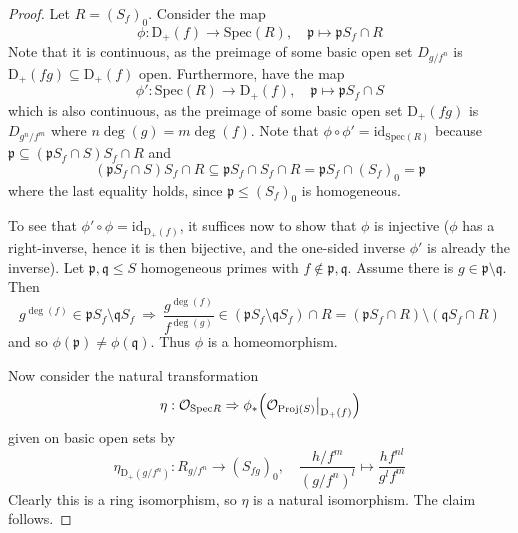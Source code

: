 \documentclass{scrartcl}
\newcommand{\D}[1]{\mathrm{D}_+(#1)}
\newcommand{\p}{\mathfrak{p}}
\newcommand{\q}{\mathfrak{q}}
\newcommand{\Spec}{\mathrm{Spec}}
\newcommand{\Proj}{\mathrm{Proj}}
\renewcommand{\O}{\mathcal{O}}
\newcommand\restr[2]{{
    \left.\kern-\nulldelimiterspace
    #1
    \vphantom{\big|}
    \right|_{#2}
}}
\theoremstyle{definition}
\begin{document}
\begin{proof}
    Let $R = (S_f)_0$.
    Consider the map
    \begin{equation*}
        \phi: \D{f} \to \Spec(R), \quad \p \mapsto \p S_f \cap R
    \end{equation*}
    Note that it is continuous, as the preimage of some basic open set $D_{g/f^n}$ is $\D{fg} \subseteq \D{f}$ open.
    Furthermore, have the map
    \begin{equation*}
        \phi': \Spec(R) \to \D{f}, \quad \p \mapsto \p S_f \cap S
    \end{equation*}
    which is also continuous, as the preimage of some basic open set $\D{fg}$ is $D_{g^n/f^m}$ where $n\deg(g) = m\deg(f)$.
    Note that $\phi \circ \phi' = \mathrm{id}_{\Spec(R)}$ because $\p \subseteq (\p S_f \cap S) S_f \cap R$ and
    \begin{equation*}
        (\p S_f \cap S) S_f \cap R \subseteq \p S_f \cap S_f \cap R = \p S_f \cap (S_f)_0 = \p
    \end{equation*}
    where the last equality holds, since $\p \leq (S_f)_0$ is homogeneous.
    
    To see that $\phi' \circ \phi = \mathrm{id}_{\D{f}}$, it suffices now to show that $\phi$ is injective ($\phi$ has a right-inverse, hence it is then bijective, and the one-sided inverse $\phi'$ is already the inverse).
    Let $\p, \q \leq S$ homogeneous primes with $f \notin \p, \q$.
    Assume there is $g \in \p \setminus \q$.
    Then
    \begin{equation*}
        g^{\deg(f)} \in \p S_f \setminus \q S_f  \ \Rightarrow \ \frac {g^{\deg(f)}} {f^{\deg(g)}} \in (\p S_f \setminus \q S_f) \cap R = (\p S_f \cap R) \setminus (\q S_f \cap R)
    \end{equation*}
    and so $\phi(\p) \neq \phi(\q)$. Thus $\phi$ is a homeomorphism.

    Now consider the natural transformation
    \begin{equation*}
        \eta: \O_{\Spec R} \Rightarrow \phi_*\Bigl( \restr{\O_{\Proj(S)}}{\D{f}} \Bigr)
    \end{equation*}
    given on basic open sets by
    \begin{equation*}
        \eta_{\D{g/f^n}}: R_{g/f^n} \to (S_{f g})_0, \quad \frac {h/f^m} {(g/f^n)^l} \mapsto \frac {h f^{nl}} {g^l f^m}
    \end{equation*}
    Clearly this is a ring isomorphism, so $\eta$ is a natural isomorphism.
    The claim follows.
\end{proof}
\end{document}
